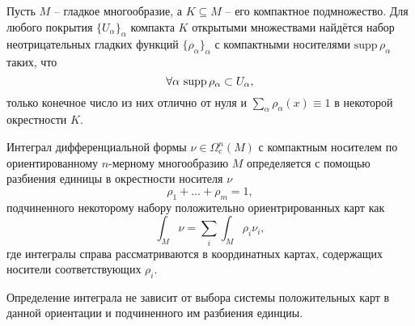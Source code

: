 \begin{to_lem}
     Пусть $M$ -- гладкое многообразие, а $K \subseteq M$ -- его компактное подмножество. Для любого покрытия $\{U_\alpha\}_\alpha$ компакта $K$ открытыми множествами найдётся набор неотрицательных гладких функций $\{\rho_\alpha\}_\alpha$ с компактными носителями $\mathrm{supp}\, \rho_\alpha$ таких, что
\begin{equation*}
    \forall \alpha \ \textnormal{supp}\, \rho_\alpha \subset U_\alpha,
\end{equation*}
    только конечное число из них отлично от нуля и
    $\sum_\alpha \rho_\alpha (x) \equiv 1$
    в некоторой окрестности $K$.
\end{to_lem}

\begin{to_def} 
    Интеграл дифференциальной формы $\nu \in \Omega_{\text{c}}^n (M)$ с компактным носителем по ориентированному $n$-мерному многообразию $M$ определяется с помощью разбиения единицы в окрестности носителя $\nu$ 
    \begin{equation*}
         \rho_1 + \ldots + \rho_m = 1,
     \end{equation*} 
     подчиненного некоторому набору положительно ориентрированных карт как
     \begin{equation*}
         \int_M \nu = \sum_i \int_M \rho_i \nu_i,
     \end{equation*}
     где интегралы справа рассматриваются в координатных картах, содержащих носители соответствующих $\rho_i$.
\end{to_def}

\begin{to_lem} 
    Определение интеграла не зависит от выбора системы положительных карт в данной ориентации и подчиненного им разбиения единциы. 
\end{to_lem}



